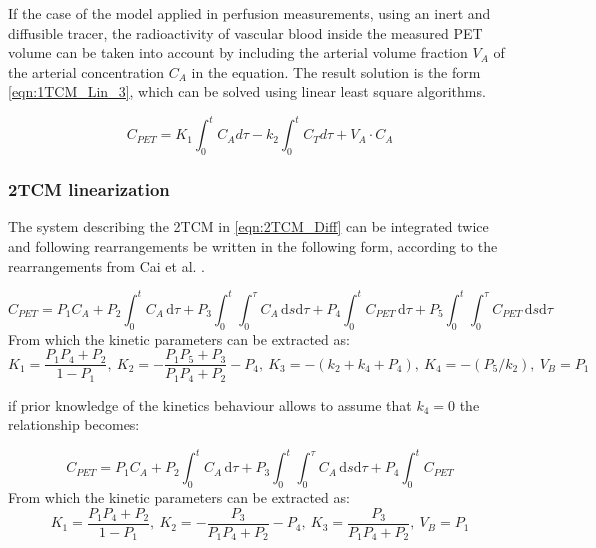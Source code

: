 If the case of the model applied in perfusion measurements, using an inert and diffusible tracer, the radioactivity of vascular blood inside the measured PET volume can be taken into account by including the arterial volume fraction  $V_A$ of the arterial concentration $C_A$ in the equation. The result solution is the form \ref{eqn:1TCM_Lin_3}, which can be solved using linear least square algorithms.

\begin{equation}
C_{PET} = K_1 \int_{0}^{t} C_A d\tau - k_2 \int_{0}^{t} C_T d\tau + V_A \cdot C_A
\label{eqn:1TCM_Lin_3}
\end{equation}

\subsubsection{2TCM linearization}
The system describing the 2TCM in \ref{eqn:2TCM_Diff} can be integrated twice and following rearrangements be written in the following form, according to the rearrangements from Cai et al. \cite{Cai2002}.   

\begin{equation} \label{microLinearization_with_k4}
C_{PET} = P_1 C_A + P_2 \int_0^t \! C_A \, \mathrm{d}\tau + P_3 \int_0^t \int_0^\tau \! C_A \,\mathrm{d}s \mathrm{d}\tau
+ P_4 \int_0^t \! C_{PET} \, \mathrm{d}\tau + P_5 \int_0^t \int_0^\tau \! C_{PET} \,\mathrm{d}s \mathrm{d}\tau
\end{equation}
\newline From which the kinetic parameters can be extracted as: 
\newline
\begin{equation} \label{ParamsLinearization_with_k4}
K_1=\frac{P_1 P_4 + P_2}{1-P_1} ,\  K_2=- \frac{P_1 P_5 + P_3}{P_1 P_4 + P_2} - P_4 ,\ K_3=-(k_2 + k_4 + P_4) 
,\ K_4=-(P_5/k_2) ,\  V_B = P_1 
\end{equation}

\newline 
if prior knowledge of the kinetics behaviour allows to assume that $k_{4} = 0 $ the relationship becomes: 

\begin{equation} \label{microLinearization_no_k4}
C_{PET} = P_1 C_A + P_2 \int_0^t \! C_A \, \mathrm{d}\tau + P_3 \int_0^t \int_0^\tau \! C_A \,\mathrm{d}s \mathrm{d}\tau
+ P_4 \int_0^t \! C_{PET} 
\end{equation}
\newline From which the kinetic parameters can be extracted as: 
\newline
\begin{equation} \label{ParamsLinearization_no_k4}
K_1=\frac{P_1 P_4 + P_2}{1-P_1} ,\  K_2=- \frac{P_3}{P_1 P_4 + P_2} - P_4 ,\ K_3=\frac{P_3}{P_1 P_4 + P_2} ,\  V_B = P_1
\end{equation}

